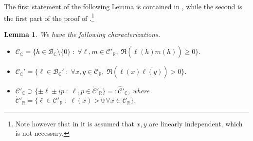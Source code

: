\documentclass{amsart}
\numberwithin{equation}{section}
\newtheorem{lem}[thm]{Lemma}
\newcommand\cB{{\mathcal B}}
\newcommand\cC{{\mathcal C}}
\newcommand\bC{{\mathbb C}}
\newcommand\bR{{\mathbb R}}
\begin{document}
The first statement of the following Lemma is contained in \cite[Proposition 5.2]{Ru10}, while the second is the first part of the proof of \cite[Lemma 4.1]{Du09}.\footnote{ Note however that in \cite[Lemma 4.1]{Du09} it is assumed that
$x,y$ are linearly independent, which is not necessary.}
\begin{lem}\label{lem:dual_comp}
We have the following characterizations.
\begin{itemize}
  \item[a)] $\displaystyle \cC_\bC=\{h\in\cB_\bC\setminus\{0\}\;:\; \forall \ell, m\in \cC'_\bR,\; \Re\left(\ell(h)\overline{m(h)}\right)\geq 0\}$.
  \item[b)] $\displaystyle \cC_\bC'=\{ \ell\in \cB_{\bC}'\;:\; \forall x, y\in \cC_\bR,\; \Re(\ell(x)\overline{\ell(y)})>0 \}$. \smallskip
  \item[c)] $\displaystyle \cC'_\bC\supset\{\pm\ell\pm i p\;:\; \ell, p\in \mathring{\cC}'_\bR\}=:\hat\cC'_{\bC}$,
where $\mathring{\cC}'_\bR=\{\ell\in\cC'_{\bR}\;:\; \ell(x)>0 \, \forall x\in\cC_{\bR}\}$.
\end{itemize}
\end{lem}
\end{document}
